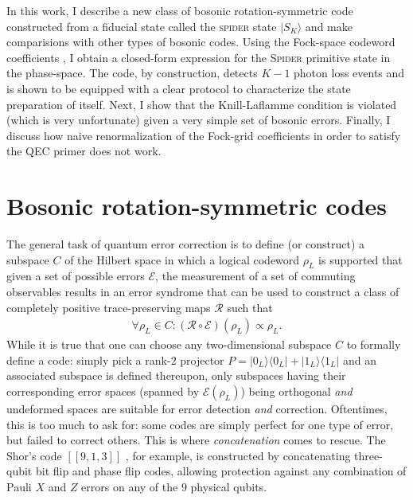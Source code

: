 \documentclass[%
 reprint,
superscriptaddress,
 amsmath,amssymb,
 aps,13pt
]{revtex4-2}
\begin{document}
In this work, I describe a new class of bosonic rotation-symmetric code constructed from a fiducial state called the \textsc{spider} state $|S_K\rangle$ and make comparisions with other types of bosonic codes. Using the Fock-space codeword coefficients \cite{lin22}, I obtain a closed-form expression for the \textsc{Spider} primitive state in the phase-space. The code, by construction, detects $K-1$ photon loss events and is shown to be equipped with a clear protocol to characterize the state preparation of itself. Next, I show that the Knill-Laflamme condition is violated (which is very unfortunate) given a very simple set of bosonic errors. Finally, I discuss how naive renormalization of the Fock-grid coefficients in order to satisfy the QEC primer does not work. 
\section{Bosonic rotation-symmetric codes}
The general task of quantum error correction is to define (or construct) a subspace $C$ of the Hilbert space in which a logical codeword $\rho_L$ is supported that given a set of possible errors $\mathcal{E}$, the measurement of a set of commuting observables results in an error syndrome that can be used to construct a class of completely positive trace-preserving maps $\mathcal{R}$ such that
\begin{align}
    \forall \rho_L \in C: (\mathcal{R}\circ \mathcal{E})(\rho_L) \propto \rho_L. 
\end{align}
While it is true that one can choose any two-dimensional subspace $C$ to formally define a code: simply pick a rank-$2$ projector $P=|0_L\rangle\langle 0_L|+|1_L\rangle\langle 1_L|$ and an associated subspace is defined thereupon, only subspaces having their corresponding error spaces (spanned by $\mathcal{E}(\rho_L)$) being orthogonal \textit{and} undeformed spaces are suitable for error detection \textit{and} correction. Oftentimes, this is too much to ask for: some codes are simply perfect for one type of error, but failed to correct others. This is where \textit{concatenation} comes to rescue. The Shor's code $[[9, 1, 3]]$ \cite{nielsen_chuang_2010}, for example, is constructed by concatenating three-qubit bit flip and phase flip codes, allowing protection against any combination of Pauli $X$ and $Z$ errors on any of the $9$ physical qubits.
\end{document}
